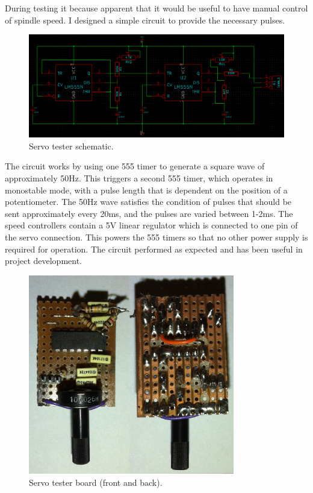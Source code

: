 \documentclass[a4paper,11pt]{article}  %
\begin{document}
During testing it because apparent that it would be useful to have manual control of spindle speed. I designed a simple circuit to provide the necessary pulses.

\begin{figure}[ht!]
\centering
\includegraphics[width=150mm]{resources/servoexerciser.png}
\caption{Servo tester schematic.}
\label{overflow}
\end{figure}

The circuit works by using one 555 timer to generate a square wave of approximately 50Hz. This triggers a second 555 timer, which operates in monostable mode, with a pulse length
that is dependent on the position of a potentiometer. The 50Hz wave satisfies the condition of pulses that should be sent approximately every 20ms, and the pulses are varied between 1-2ms. The speed controllers
contain a 5V linear regulator which is connected to one pin of the servo connection. This powers the 555 timers so that no other power supply is required for operation. The circuit performed as expected and 
has been useful in project development.

\begin{figure}[ht!]
\centering
\includegraphics[width=90mm]{resources/servotester.jpg}
\caption{Servo tester board (front and back).}
\label{overflow}
\end{figure}
\end{document}
